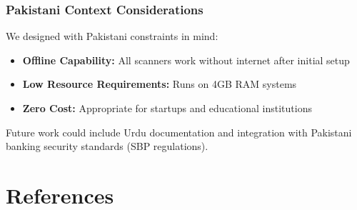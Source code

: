 \documentclass[12pt,a4paper]{report}
\begin{document}
\subsection{Pakistani Context Considerations}

We designed with Pakistani constraints in mind:

\begin{itemize}
    \item \textbf{Offline Capability:} All scanners work without internet after initial setup
    \item \textbf{Low Resource Requirements:} Runs on 4GB RAM systems
    \item \textbf{Zero Cost:} Appropriate for startups and educational institutions
\end{itemize}

Future work could include Urdu documentation and integration with Pakistani banking security standards (SBP regulations).

\chapter{References}
\label{chap:references}
\end{document}
